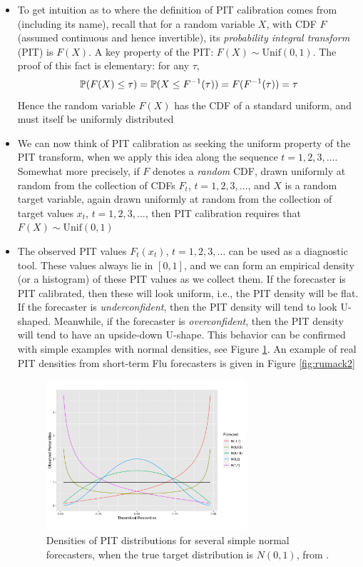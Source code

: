\documentclass{article}
\begin{document}
\begin{itemize}
\item To get intuition as to where the definition of PIT calibration comes from 
  (including its name), recall that for a random variable $X$, with CDF $F$
  (assumed continuous and hence invertible), its \emph{probability integral
    transform} (PIT) is $F(X)$. A key property of the PIT: $F(X) \sim
  \mathrm{Unif}(0,1)$. The proof of this fact is elementary: for any $\tau$, 
  \[
  \P(F(X) \leq \tau) = \P(X \leq F^{-1}(\tau)) = F(F^{-1}(\tau)) = \tau
  \]
  Hence the random variable $F(X)$ has the CDF of a standard uniform, and must
  itself be uniformly distributed 

\item We can now think of PIT calibration as seeking the uniform property of 
  the PIT transform, when we apply this idea along the sequence $t =
  1,2,3,\dots$. Somewhat more precisely, if $F$ denotes a \emph{random} CDF, 
  drawn uniformly at random from the collection of CDFs $F_t$, $t =
  1,2,3,\dots$, and $X$ is a random target variable, again drawn uniformly at
  random from the collection of target values $x_t$, $t = 1,2,3,\dots$, then PIT
  calibration requires that $F(X) \sim \mathrm{Unif}(0,1)$   

\item The observed PIT values $F_t(x_t)$, $t = 1,2,3,\dots$ can be used as a
  diagnostic tool. These values always lie in $[0,1]$, and we can form an
  empirical density (or a histogram) of these PIT values as we collect them. If
  the forecaster is PIT calibrated, then these will look uniform, i.e., the PIT
  density will be flat. If the forecaster is \emph{underconfident}, then the PIT
  density will tend to look U-shaped. Meanwhile, if the forecaster is
  \emph{overconfident}, then the PIT density will tend to have an upside-down 
  U-shape. This behavior can be confirmed with simple examples with normal
  densities, see Figure \ref{fig:rumack1}. An example of real PIT densities from
  short-term Flu forecasters is given in Figure \ref{fig:rumack2}  

\begin{figure}[p]
\centering
\includegraphics[width=0.7\textwidth]{rumack1.png}
\vspace{-15pt}
\caption{Densities of PIT distributions for several simple normal forecasters,
  when the true target distribution is $N(0,1)$, from
  \citet{rumack2022recalibrating}.}  
\label{fig:rumack1}   


\end{figure}
\end{itemize}
\end{document}
